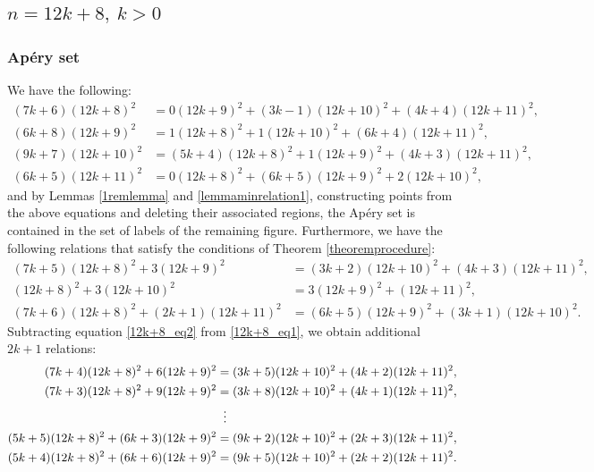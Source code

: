 \documentclass[12pt]{article}
\theoremstyle{remark}
\begin{document}
\subsection{$n = 12k +8, \ k>0$}
\subsubsection{Ap{\'e}ry set}
We have the following:
\begin{align}
    (7k+6)(12k+8)^2 &= 0(12k+9)^2 + (3k-1)(12k+10)^2 + (4k+4)(12k+11)^2, \label{12k+8minrelation0} \\
    (6k+8)(12k+9)^2 &= 1(12k+8)^2 + 1(12k+10)^2 + (6k+4)(12k+11)^2, \label{12k+8minrelation1} \\
    (9k+7)(12k+10)^2 &= (5k+4)(12k+8)^2 + 1(12k+9)^2 + (4k+3)(12k+11)^2, \label{12k+8minrelation2}\\
    (6k+5)(12k+11)^2 &= 0(12k+8)^2 + (6k+5)(12k+9)^2 + 2(12k+10)^2,  \label{12k+8minrelation3}
\end{align}
and by Lemmas \ref{1remlemma} and \ref{lemmaminrelation1}, constructing points from the above equations and deleting their associated regions, the Ap{\'e}ry set is contained in the set of labels of the remaining figure.
Furthermore, we have the following relations that satisfy the conditions of Theorem \ref{theoremprocedure}:
\begin{align}
(7k+5)(12k+8)^2 + 3(12k+9)^2  &= (3k+2)(12k+10)^2 + (4k+3)(12k+11)^2, \label{12k+8_eq1} \\
(12k+8)^2 + 3(12k+10)^2 &= 3(12k+9)^2 + (12k+11)^2,\label{12k+8_eq2} \\
(7k+6)(12k+8)^2 + (2k+1)(12k+11)^2 &= (6k+5)(12k+9)^2 + (3k+1)(12k+10)^2. \label{12k+8_eq3}  
\end{align}
Subtracting equation \eqref{12k+8_eq2} from \eqref{12k+8_eq1}, we obtain additional $2k+1$ relations:
\begin{equation}\label{12k+8_2k+1equations_1}
\begin{aligned}    
(7k+4)(12k+8)^2 + 6(12k+9)^2  &= (3k+5)(12k+10)^2 + (4k+2)(12k+11)^2 ,\\
(7k+3)(12k+8)^2 + 9(12k+9)^2  &= (3k+8)(12k+10)^2 + (4k+1)(12k+11)^2 ,\\
 & \hspace{5.6pt}  \vdots      \\
(5k+5)(12k+8)^2 + (6k+3)(12k+9)^2  &= (9k+2)(12k+10)^2 + (2k+3)(12k+11)^2 ,\\
(5k+4)(12k+8)^2 + (6k+6)(12k+9)^2  &= (9k+5)(12k+10)^2 + (2k+2)(12k+11)^2 .
\end{aligned}
\end{equation}
\end{document}

